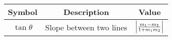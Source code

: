     \begin{tabular}{|c|c|c|}
    \hline
     \textbf{Symbol} &\textbf{Description} &\textbf{Value} \\
        \hline
        $\tan{\theta}$&Slope between two lines &$\left|\frac{m_1-m_2}{1+m_1m_2}\right|$ \\
        \hline    
    \end{tabular}
